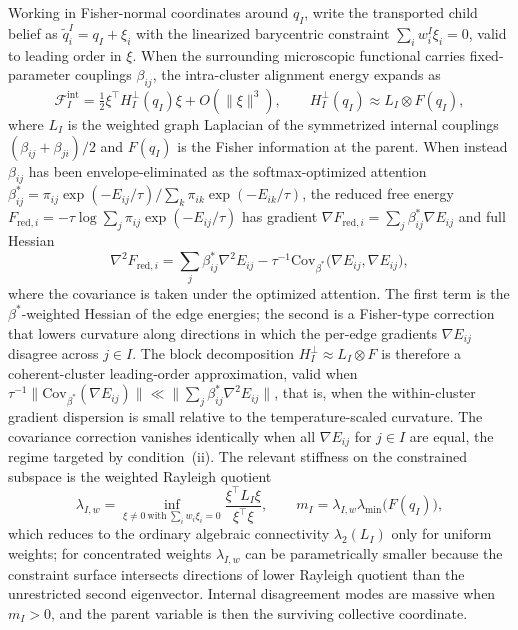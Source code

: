 \documentclass[11pt]{article}
\begin{document}
Working in Fisher-normal coordinates around $q_I$, write the transported child belief as $\widetilde{q}_i^I = q_I + \xi_i$ with the linearized barycentric constraint $\sum_i w_i^I \xi_i = 0$, valid to leading order in $\xi$. When the surrounding microscopic functional carries fixed-parameter couplings $\beta_{ij}$, the intra-cluster alignment energy expands as
\begin{equation}
\mathcal{F}_I^{\mathrm{int}} = \tfrac{1}{2}\xi^\top H_I^\perp(q_I)\xi + O(\|\xi\|^3), \qquad H_I^\perp(q_I) \approx L_I \otimes F(q_I),
\label{eq:rg_internal_hessian}
\end{equation}
where $L_I$ is the weighted graph Laplacian of the symmetrized internal couplings $(\beta_{ij} + \beta_{ji})/2$ and $F(q_I)$ is the Fisher information at the parent. When instead $\beta_{ij}$ has been envelope-eliminated as the softmax-optimized attention $\beta^*_{ij} = \pi_{ij} \exp(-E_{ij}/\tau) / \sum_k \pi_{ik} \exp(-E_{ik}/\tau)$, the reduced free energy $F_{\mathrm{red},i} = -\tau \log \sum_j \pi_{ij} \exp(-E_{ij}/\tau)$ has gradient $\nabla F_{\mathrm{red},i} = \sum_j \beta^*_{ij} \nabla E_{ij}$ and full Hessian
\begin{equation}
\nabla^2 F_{\mathrm{red},i} = \sum_j \beta^*_{ij} \nabla^2 E_{ij} - \tau^{-1} \mathrm{Cov}_{\beta^*}\big(\nabla E_{ij}, \nabla E_{ij}\big),
\end{equation}
where the covariance is taken under the optimized attention. The first term is the $\beta^*$-weighted Hessian of the edge energies; the second is a Fisher-type correction that lowers curvature along directions in which the per-edge gradients $\nabla E_{ij}$ disagree across $j \in I$. The block decomposition $H_I^\perp \approx L_I \otimes F$ is therefore a coherent-cluster leading-order approximation, valid when $\tau^{-1}\|\mathrm{Cov}_{\beta^*}(\nabla E_{ij})\| \ll \|\sum_j \beta^*_{ij} \nabla^2 E_{ij}\|$, that is, when the within-cluster gradient dispersion is small relative to the temperature-scaled curvature. The covariance correction vanishes identically when all $\nabla E_{ij}$ for $j \in I$ are equal, the regime targeted by condition~(ii). The relevant stiffness on the constrained subspace is the weighted Rayleigh quotient
\begin{equation}
\lambda_{I,w} = \inf_{\xi \neq 0\ \text{with}\ \sum_i w_i \xi_i = 0} \frac{\xi^\top L_I \xi}{\xi^\top \xi}, \qquad m_I = \lambda_{I,w}\lambda_{\min}\big(F(q_I)\big),
\label{eq:rg_constrained_gap}
\end{equation}
which reduces to the ordinary algebraic connectivity $\lambda_2(L_I)$ only for uniform weights; for concentrated weights $\lambda_{I,w}$ can be parametrically smaller because the constraint surface intersects directions of lower Rayleigh quotient than the unrestricted second eigenvector. Internal disagreement modes are massive when $m_I > 0$, and the parent variable is then the surviving collective coordinate.
\end{document}
